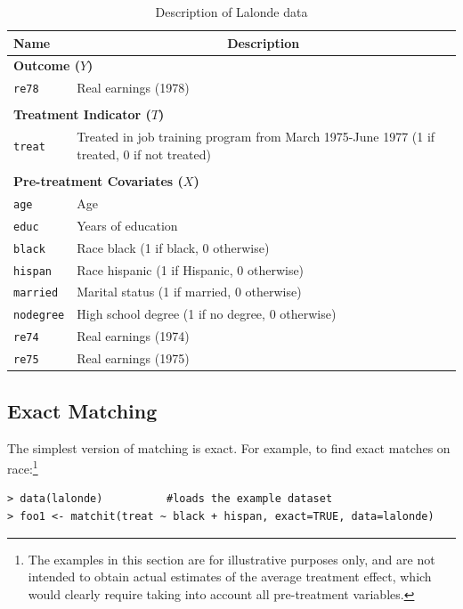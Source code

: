 \documentclass[oneside,letterpaper,titlepage]{article}
\begin{document}
\begin{table}[h]
\label{dwvars}
\centering
\begin{tabular}{lp{3in}}
  \hline 
  \multicolumn{1}{l}{Name} & \multicolumn{1}{c}{Description} \\
  \hline
  \multicolumn{2}{l}{\textbf{Outcome ($Y$)}} \\ 
  \texttt{re78} & Real earnings (1978) \\\\
  \multicolumn{2}{l}{\textbf{Treatment Indicator ($T$)}} \\
  \texttt{treat} & Treated in job training program from March 1975-June
  1977 (1 if treated, 0 if not treated)
  \\ \\
  \multicolumn{2}{l}{\textbf{Pre-treatment Covariates ($X$)}} \\
  \texttt{age} & Age\\
  \texttt{educ} & Years of education \\
  \texttt{black} & Race black (1 if black, 0 otherwise) \\
  \texttt{hispan} & Race hispanic  (1 if Hispanic, 0 otherwise) \\
  \texttt{married} & Marital status (1 if married, 0 otherwise) \\
  \texttt{nodegree} & High school degree (1 if no degree, 0 otherwise)\\
  \texttt{re74} & Real earnings (1974) \\
  \texttt{re75} & Real earnings (1975) \\ 
  \hline
\end{tabular}\label{lalonde}
\caption{Description of Lalonde data}
\end{table}

\subsection{Exact Matching \label{exactm}}
The simplest version of matching is exact.  For example, to find exact
matches on race:\footnote{The examples in this section are for illustrative
  purposes only, and are not intended to obtain actual estimates of
  the average treatment effect, which would clearly require taking
  into account all pre-treatment variables.}

\begin{verbatim}
> data(lalonde)          #loads the example dataset
> foo1 <- matchit(treat ~ black + hispan, exact=TRUE, data=lalonde)
\end{verbatim}
\end{document}

